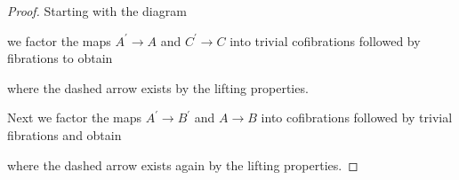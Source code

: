 \begin{lemma}
\begin{proof}
        Starting with the diagram
        \begin{center}
        \end{center}
        we factor the maps $A^{\prime}\to A$ and $C^{\prime}\to C$ into trivial cofibrations followed by fibrations to obtain
        \begin{center}
        \end{center}
        where the dashed arrow exists by the lifting properties.

        Next we factor the maps $A^{\prime}\to B^{\prime}$ and $A\to B$ into cofibrations followed by trivial fibrations and obtain 
        \begin{center}
        \end{center}
        where the dashed arrow exists again by the lifting properties.


\end{proof}
\end{lemma}
